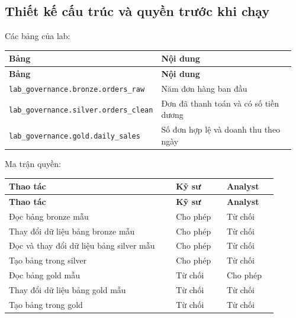 \subsection{Thiết kế cấu trúc và quyền trước khi chạy}

Các bảng của lab:


\begingroup\small
\renewcommand{\arraystretch}{1.2}
\begin{longtable}{@{}p{0.4\linewidth}p{0.56\linewidth}@{}}
\toprule
\rowcolor{rowLavender}
\textbf{Bảng} & \textbf{Nội dung} \\
\midrule
\endfirsthead
\toprule
\rowcolor{rowLavender}
\textbf{Bảng} & \textbf{Nội dung} \\
\midrule
\endhead
\bottomrule
\endfoot
\texttt{lab\_\allowbreak{}governance.\allowbreak{}bronze.\allowbreak{}orders\_\allowbreak{}raw} & Năm đơn hàng ban đầu \\
\texttt{lab\_\allowbreak{}governance.\allowbreak{}silver.\allowbreak{}orders\_\allowbreak{}clean} & Đơn đã thanh toán và có số tiền dương \\
\texttt{lab\_\allowbreak{}governance.\allowbreak{}gold.\allowbreak{}daily\_\allowbreak{}sales} & Số đơn hợp lệ và doanh thu theo ngày \\
\end{longtable}
\endgroup

Ma trận quyền:


\begingroup\small
\renewcommand{\arraystretch}{1.2}
\begin{longtable}{@{}p{0.56\linewidth}p{0.17\linewidth}p{0.17\linewidth}@{}}
\toprule
\rowcolor{rowLavender}
\textbf{Thao tác} & \textbf{Kỹ sư} & \textbf{Analyst} \\
\midrule
\endfirsthead
\toprule
\rowcolor{rowLavender}
\textbf{Thao tác} & \textbf{Kỹ sư} & \textbf{Analyst} \\
\midrule
\endhead
\bottomrule
\endfoot
Đọc bảng bronze mẫu & Cho phép & Từ chối \\
Thay đổi dữ liệu bảng bronze mẫu & Cho phép & Từ chối \\
Đọc và thay đổi dữ liệu bảng silver mẫu & Cho phép & Từ chối \\
Tạo bảng trong silver & Cho phép & Từ chối \\
Đọc bảng gold mẫu & Từ chối & Cho phép \\
Thay đổi dữ liệu bảng gold mẫu & Từ chối & Từ chối \\
Tạo bảng trong gold & Từ chối & Từ chối \\
\end{longtable}
\endgroup

